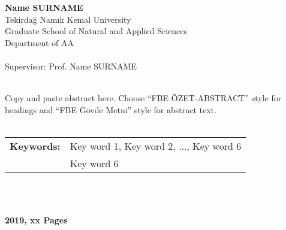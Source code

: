 \begin{center}
	\textbf{Name SURNAME}\\
	Tekirdağ Namık Kemal University\\
	Graduate School of Natural and Applied Sciences\\
	Department of AA\\~\\
	Supervisor: Prof. Name SURNAME
	\\~\\
\end{center}

Copy and paste abstract here. Choose “FBE ÖZET-ABSTRACT” style for headings and “FBE Gövde Metni” style for abstract text. 
\\~\\
\begin{tabular}{ll}
	\textbf{Keywords:}& Key word 1, Key word 2, ..., Key word 6\\
	&Key word 6
\end{tabular}
\\~\\
\begin{center}
	\textbf{2019, xx Pages}
\end{center}